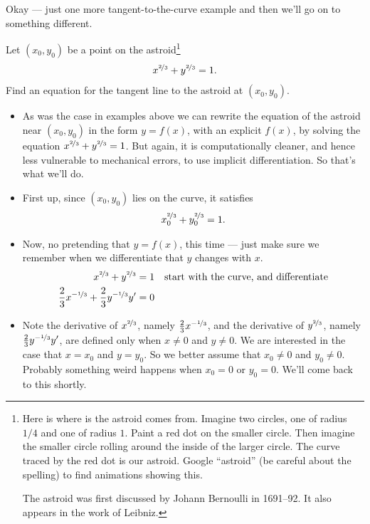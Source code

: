 Okay --- just one more tangent-to-the-curve example and then we'll go on to
something different.
\begin{eg}\label{eg:DIFFimpldiffB}
Let $(x_0,y_0)$ be a point on the astroid\footnote{Here is where is the
astroid comes from. Imagine two circles, one of radius $1/4$ and
one of radius $1$. Paint a red dot on the smaller circle. Then imagine
the smaller circle rolling around the inside of the larger circle. The
curve traced by the red dot is our astroid. Google ``astroid'' (be careful
about the spelling) to find animations showing this.

The astroid was first discussed by Johann Bernoulli in 1691--92. It also
appears in the work of Leibniz.}
\begin{align*}
x^{\nicefrac{2}{3}}+y^{\nicefrac{2}{3}}=1.
\end{align*}
Find an equation for the tangent line to the astroid at $(x_0,y_0)$.

\begin{itemize}
 \item As was the case in examples above we can rewrite the equation of
the astroid near $(x_0,y_0)$ in the form $y=f(x)$, with an explicit $f(x)$, by
solving the equation $x^{\nicefrac{2}{3}}+y^{\nicefrac{2}{3}}=1$. But again, it
is computationally cleaner, and hence less vulnerable to mechanical errors, to
use implicit differentiation. So that's what we'll do.

\item First up, since $(x_0,y_0)$ lies on the curve, it satisfies
\begin{align*}
x_0^{\nicefrac{2}{3}}+y_0^{\nicefrac{2}{3}}=1.
\end{align*}

\item Now, no pretending that $y=f(x)$, this time --- just make sure we
remember when we differentiate that $y$ changes with $x$.
\begin{align*}
  x^{\nicefrac{2}{3}}+y^{\nicefrac{2}{3}} &=1 &\text{start with the curve, and
differentiate}\\
\frac{2}{3}x^{-\nicefrac{1}{3}} + \frac{2}{3} y^{-\nicefrac{1}{3}} y' &=0
\end{align*}

\item Note the derivative of $x^{\nicefrac{2}{3}}$, namely
$\frac{2}{3}x^{-\nicefrac{1}{3}}$, and the derivative of
$y^{\nicefrac{2}{3}}$, namely $\frac{2}{3} y^{-\nicefrac{1}{3}}y'$,
are defined only when $x\ne 0$ and $y\ne 0$. We are interested in the case that
$x=x_0$ and $y=y_0$. So we better assume that $x_0\ne 0$ and $y_0\ne 0$.
Probably something weird happens when $x_0=0$ or $y_0=0$. We'll come back to
this shortly.


\end{itemize}
\end{eg}
